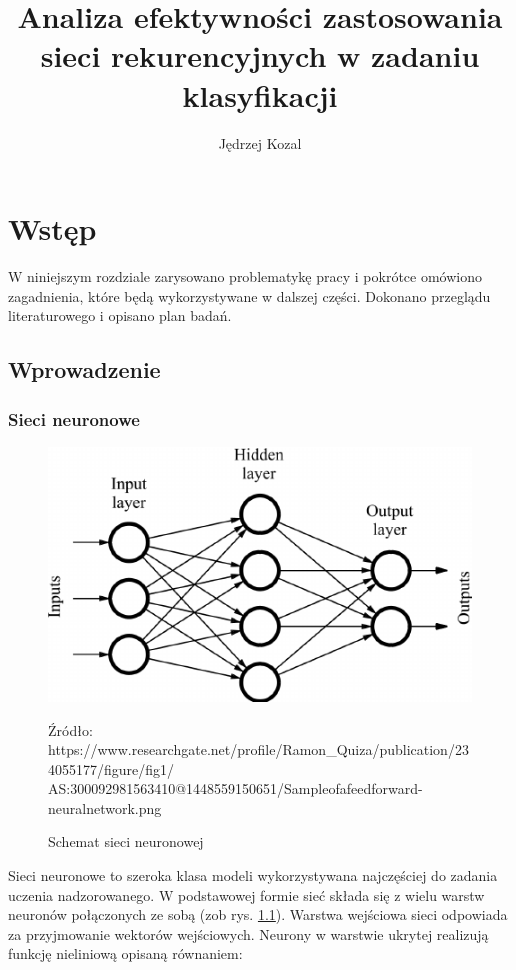 \documentclass[oneside, mag]{mgr}
\title{Analiza efektywności zastosowania sieci rekurencyjnych w zadaniu klasyfikacji}
\author{Jędrzej Kozal}
\begin{document}
	

\maketitle

\tableofcontents

\chapter{Wstęp}

W niniejszym rozdziale zarysowano problematykę pracy i pokrótce omówiono zagadnienia, które będą wykorzystywane w dalszej części. Dokonano przeglądu literaturowego i opisano plan badań.

\section{Wprowadzenie}

\subsection{Sieci neuronowe}

\begin{figure}
	\centering
	\includegraphics[scale=0.7]{img/feed-forward-nn.png}
	\caption{Schemat sieci neuronowej} Źródło: https://www.researchgate.net/profile/Ramon\_Quiza/publication/234055177/figure/fig1/\\AS:300092981563410@1448559150651/Sample\-of\-a\-feed\-forward-neural\-network.png
	\label{feedforward-NN}
\end{figure}

Sieci neuronowe to szeroka klasa modeli wykorzystywana najczęściej do zadania uczenia nadzorowanego. W podstawowej formie sieć składa się z wielu warstw neuronów połączonych ze sobą (zob rys. \ref{feedforward-NN}). Warstwa wejściowa sieci odpowiada za przyjmowanie wektorów wejściowych. Neurony w warstwie ukrytej realizują funkcję nieliniową opisaną równaniem:
\end{document}
